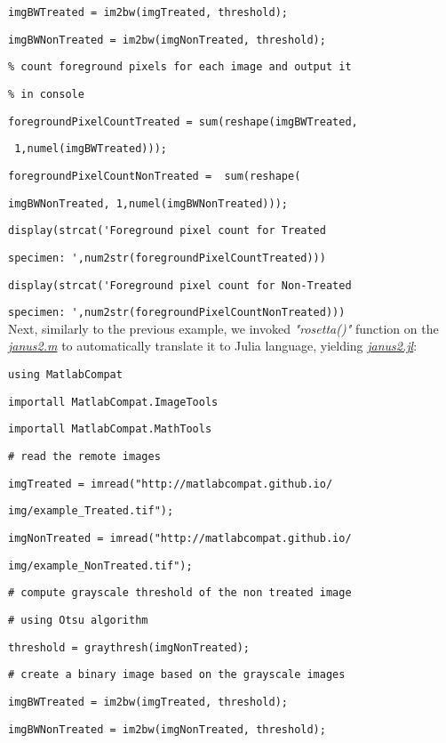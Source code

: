 \verb|imgBWTreated = im2bw(imgTreated, threshold);|

\verb|imgBWNonTreated = im2bw(imgNonTreated, threshold);|

\verb|% count foreground pixels for each image and output it|

\verb|% in console|

\verb|foregroundPixelCountTreated = sum(reshape(imgBWTreated,|

\verb| 1,numel(imgBWTreated)));|

\verb|foregroundPixelCountNonTreated =  sum(reshape(|

\verb|imgBWNonTreated, 1,numel(imgBWNonTreated)));|

\verb|display(strcat('Foreground pixel count for Treated |

\verb|specimen: ',num2str(foregroundPixelCountTreated)))|

\verb|display(strcat('Foreground pixel count for Non-Treated|

\verb|specimen: ',num2str(foregroundPixelCountNonTreated)))|\\


Next, similarly to the previous example, we invoked \textit{"rosetta()"} function on the \textit{\href{http://}{janus2.m}} to automatically translate it to Julia language, yielding \textit{\textit{\href{http://}{janus2.jl}}}:


\verb|using MatlabCompat|

\verb|importall MatlabCompat.ImageTools|

\verb|importall MatlabCompat.MathTools|

\verb|# read the remote images|

\verb|imgTreated = imread("http://matlabcompat.github.io/|

\verb|img/example_Treated.tif");|

\verb|imgNonTreated = imread("http://matlabcompat.github.io/|

\verb|img/example_NonTreated.tif");|

\verb|# compute grayscale threshold of the non treated image|

\verb|# using Otsu algorithm|

\verb|threshold = graythresh(imgNonTreated);|

\verb|# create a binary image based on the grayscale images|

\verb|imgBWTreated = im2bw(imgTreated, threshold);|

\verb|imgBWNonTreated = im2bw(imgNonTreated, threshold);|

